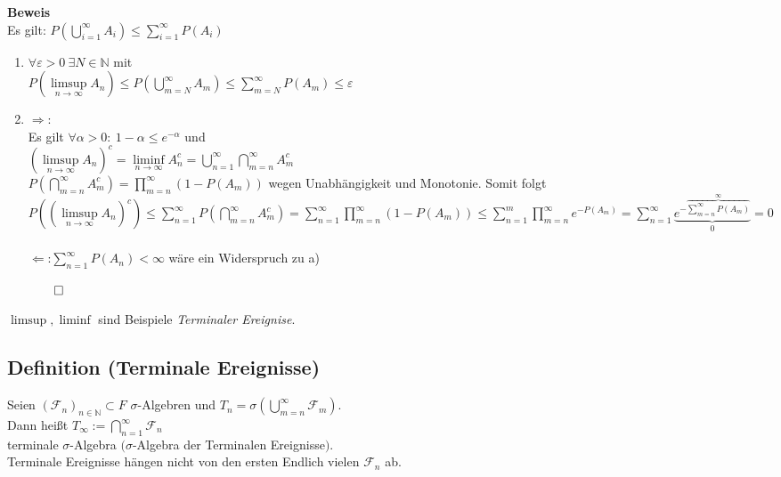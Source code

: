\documentclass[german,10pt,oneside, fleqn, a4paper]{article}
\newcommand {\N}	{\mathbb{N}}
\newcommand{\QED}{\begin{flushright}$\qed$\end{flushright}}
\newcommand{\mc}[1]{\mathcal{#1}}
\newcommand{\1}[1]{1_{#1}}
\newcommand{\2}[1]{\1{\brac{#1}}}
\newcommand{\f}{\mc{F}}
\begin{document}
\textbf{Beweis}\\
Es gilt: $P \left(\bigcup\limits_{i=1}^\infty A_i\right) \leq \sum\limits_{i=1}^\infty P(A_i)$\begin{enumerate}[label=(\alph*)]
\item $\forall \varepsilon>0\ \exists N\in\N$ mit\\
$P\left(\limsup\limits_{n\rightarrow\infty}A_n\right)\leq P\left(\bigcup\limits_{m=N}^\infty A_m \right) \leq \sum\limits_{m=N}^\infty P(A_m) \leq \varepsilon$
\item \glqq $\Rightarrow$\grqq:\\
Es gilt $\forall\alpha>0:\ 1-\alpha\leq e^{-\alpha}$ und\\
 $\left(\limsup\limits_{n\rightarrow\infty}A_n\right)^c=\liminf\limits_{n\rightarrow\infty}A_n^c=\bigcup\limits_{n=1}^\infty\bigcap\limits_{m=n}^\infty A_m^c$\\
$P\left(\bigcap\limits_{m=n}^\infty A_m^c\right)=\prod\limits_{m=n}^\infty\left(1-P(A_m)\right)$ wegen Unabhängigkeit und Monotonie. Somit folgt\\
$P((\limsup\limits_{n\rightarrow\infty}A_n)^c)
\leq\sum\limits_{n=1}^\infty P\left(\bigcap\limits_{m=n}^\infty A_m^c\right)
=\sum\limits_{n=1}^\infty\prod\limits_{m=n}^\infty (1-P(A_m))
\leq\sum\limits_{n=1}^m\prod\limits_{m=n}^\infty e^{-P(A_m)}
=\sum\limits_{n=1}^\infty \underbrace{e^{-\overbrace{\sum\limits_{m=n}^\infty P(A_m)}^{\infty}}}_{0}=0$\\\\
\glqq $\Leftarrow$\grqq:$\sum\limits_{n=1}^\infty P(A_n)<\infty$ wäre ein Widerspruch zu a)  \QED
\end{enumerate}

$\limsup , \liminf$ sind Beispiele \textit{Terminaler Ereignise}.






\subsection{Definition (Terminale Ereignisse)}
Seien $(\f_n)_{n\in\N}\subset F$ $\sigma$-Algebren und $T_n=\sigma\left(\bigcup\limits_{m=n}^\infty\f_m\right)$. \\
Dann heißt $T_\infty:=\bigcap\limits_{n=1}^\infty\f_n$\\ terminale $\sigma$-Algebra $(\sigma$-Algebra der Terminalen Ereignisse$)$. \\
Terminale Ereignisse hängen nicht von den ersten Endlich vielen $\f_n$ ab.
\end{document}
